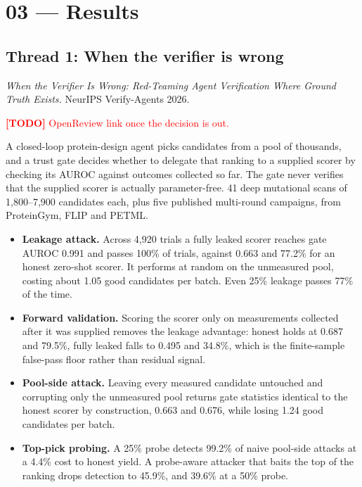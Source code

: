 \documentclass[11pt]{article}
\newcommand{\todo}[1]{\par\medskip\noindent\textcolor{red}{\textbf{[TODO]} #1}\par\medskip}
\begin{document}
\section*{03 --- Results}

\subsection*{Thread 1: When the verifier is wrong}

\emph{When the Verifier Is Wrong: Red-Teaming Agent Verification Where Ground Truth Exists.}
NeurIPS Verify-Agents 2026. \todo{OpenReview link once the decision is out.}

A closed-loop protein-design agent picks candidates from a pool of thousands, and a trust gate decides whether
to delegate that ranking to a supplied scorer by checking its AUROC against outcomes collected so far. The gate
never verifies that the supplied scorer is actually parameter-free. 41 deep mutational scans of 1{,}800--7{,}900
candidates each, plus five published multi-round campaigns, from ProteinGym, FLIP and PETML.

\begin{itemize}[leftmargin=1.2em]
  \item \textbf{Leakage attack.} Across 4{,}920 trials a fully leaked scorer reaches gate AUROC 0.991 and
  passes 100\% of trials, against 0.663 and 77.2\% for an honest zero-shot scorer. It performs at random on
  the unmeasured pool, costing about 1.05 good candidates per batch. Even 25\% leakage passes 77\% of the time.
  \item \textbf{Forward validation.} Scoring the scorer only on measurements collected after it was supplied
  removes the leakage advantage: honest holds at 0.687 and 79.5\%, fully leaked falls to 0.495 and 34.8\%,
  which is the finite-sample false-pass floor rather than residual signal.
  \item \textbf{Pool-side attack.} Leaving every measured candidate untouched and corrupting only the
  unmeasured pool returns gate statistics identical to the honest scorer by construction, 0.663 and 0.676,
  while losing 1.24 good candidates per batch.
  \item \textbf{Top-pick probing.} A 25\% probe detects 99.2\% of naive pool-side attacks at a 4.4\% cost to
  honest yield. A probe-aware attacker that baits the top of the ranking drops detection to 45.9\%, and 39.6\%
  at a 50\% probe.
\end{itemize}
\end{document}
